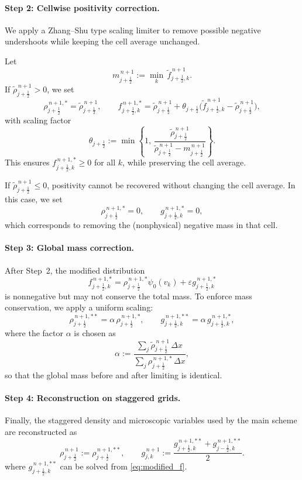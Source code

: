 \documentclass[11pt,twoside]{article}
\theoremstyle{nonumberplain}
\begin{document}
\paragraph{Step 2: Cellwise positivity correction.}
We apply a Zhang--Shu type scaling limiter to remove possible negative undershoots while keeping the cell average unchanged.

Let
\[
    m_{j+\frac12}^{\,n+1} := \min_{k}\, \tilde{f}_{j+\frac12,k}^{\,n+1}.
\]
If $\tilde{\rho}_{j+\frac12}^{\,n+1} > 0$, we set
\[
    \rho_{j+\frac12}^{\,n+1,*} = \tilde{\rho}_{j+\frac12}^{\,n+1}, \qquad
    f_{j+\frac12,k}^{\,n+1,*}
    = \tilde{\rho}_{j+\frac12}^{\,n+1} + \theta_{j+\frac12} \big(\tilde{f}_{j+\frac12,k}^{\,n+1} - \tilde{\rho}_{j+\frac12}^{\,n+1}\big),
\]
with scaling factor
\[
    \theta_{j+\frac12}
    := \min\left\{
        1,\,
        \frac{\tilde{\rho}_{j+\frac12}^{\,n+1}}
        {\tilde{\rho}_{j+\frac12}^{\,n+1} - m_{j+\frac12}^{\,n+1}}
    \right\}.
\]
This ensures $f_{j+\frac12,k}^{\,n+1,*} \ge 0$ for all $k$, while preserving the cell average.

If $\tilde{\rho}_{j+\frac12}^{\,n+1}\le 0$, positivity cannot be recovered without changing the cell average.  
In this case, we set
\[
    \rho_{j+\frac12}^{\,n+1,*}=0,\qquad
    g_{j+\frac12,k}^{\,n+1,*}=0,
\]
which corresponds to removing the (nonphysical) negative mass in that cell.

\paragraph{Step 3: Global mass correction.}
After Step~2, the modified distribution
\begin{equation}\label{eq:modified_f}
    f_{j+\frac12,k}^{\,n+1,*}
    = \rho_{j+\frac12}^{\,n+1,*}\psi_0(v_k)
    + \varepsilon g_{j+\frac12,k}^{\,n+1,*}
\end{equation}
is nonnegative but may not conserve the total mass.  
To enforce mass conservation, we apply a uniform scaling:
\[
    \rho_{j+\frac12}^{\,n+1,**} = \alpha\,\rho_{j+\frac12}^{\,n+1,*},
    \qquad
    g_{j+\frac12,k}^{\,n+1,**} = \alpha\,g_{j+\frac12,k}^{\,n+1,*},
\]
where the factor $\alpha$ is chosen as
\[
    \alpha
    := \frac{\displaystyle\sum_{j}\tilde{\rho}_{j+\frac12}^{\,n+1}\,\Delta x}
            {\displaystyle\sum_{j}\rho_{j+\frac12}^{\,n+1,*}\,\Delta x},
\]
so that the global mass before and after limiting is identical.

\paragraph{Step 4: Reconstruction on staggered grids.}
Finally, the staggered density and microscopic variables used by the main scheme are reconstructed as
\[
    \rho_{j+\frac12}^{\,n+1}
    := \rho_{j+\frac12}^{\,n+1,**},
    \qquad
    g_{j,k}^{\,n+1} := \frac{g_{j+\frac12,k}^{\,n+1,**}+g_{j-\frac12,k}^{\,n+1,**}}{2}.
\]
where $g_{j+\frac12,k}^{\,n+1,**}$ can be solved from \eqref{eq:modified_f}. 
\end{document}
